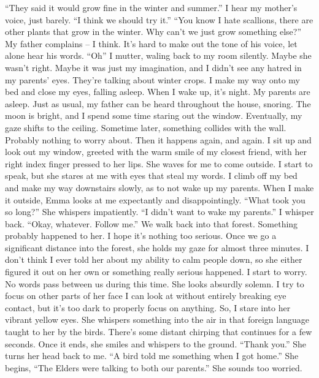 \documentclass[openany, 12pt]{book}
\newcommand\tab[1][1cm]{\hspace*{#1}}
\begin{document}
\newline
\tab
``They said it would grow fine in the winter and summer.'' I hear my mother’s voice, just barely. ``I think we should try it.''
\newline
\tab
``You know I hate scallions, there are other plants that grow in the winter. Why can’t we just grow something else?'' My father complains -- I think. It’s hard to make out the tone of his voice, let alone hear his words. 
\newline
\tab
``Oh'' I mutter, waling back to my room silently. Maybe she wasn’t right. Maybe it was just my imagination, and I didn’t see any hatred in my parents’ eyes. They’re talking about winter crops. I make my way onto my bed and close my eyes, falling asleep. When I wake up, it’s night. My parents are asleep. Just as usual, my father can be heard throughout the house, snoring. The moon is bright, and I spend some time staring out the window. Eventually, my gaze shifts to the ceiling.
\newline
\tab
Sometime later, something collides with the wall. Probably nothing to worry about. Then it happens again, and again. I sit up and look out my window, greeted with the warm smile of my closest friend, with her right index finger pressed to her lips. She waves for me to come outside. I start to speak, but she stares at me with eyes that steal my words.
\newline
\tab
I climb off my bed and make my way downstairs slowly, as to not wake up my parents. When I make it outside, Emma looks at me expectantly and disappointingly. ``What took you so long?'' She whispers impatiently.
\newline
\tab
``I didn’t want to wake my parents.'' I whisper back.
\newline
\tab
``Okay, whatever. Follow me.'' We walk back into that forest. Something probably happened to her. I hope it’s nothing too serious. Once we go a significant distance into the forest, she holds my gaze for almost three minutes. I don’t think I ever told her about my ability to calm people down, so she either figured it out on her own or something really serious happened. I start to worry. No words pass between us during this time. She looks absurdly solemn. I try to focus on other parts of her face I can look at without entirely breaking eye contact, but it’s too dark to properly focus on anything. So, I stare into her vibrant yellow eyes. She whispers something into the air in that foreign language taught to her by the birds. There’s some distant chirping that continues for a few seconds. Once it ends, she smiles and whispers to the ground. ``Thank you.'' She turns her head back to me. ``A bird told me something when I got home.'' She begins, ``The Elders were talking to both our parents.'' She sounds too worried.
\end{document}
